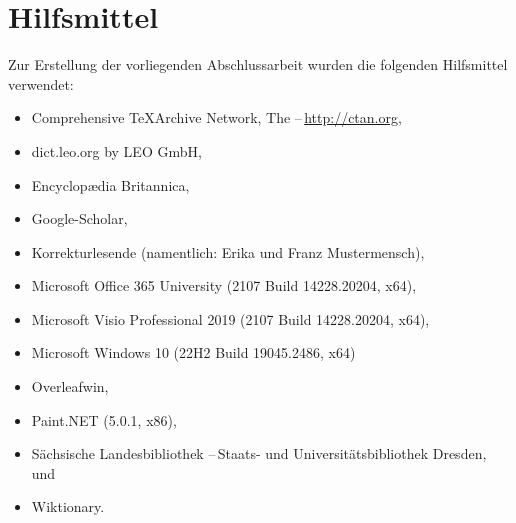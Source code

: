 \renewcommand{\bibname}{Quellenverzeichnis}


\label{Bibliography}
{}

\clearpage\section*{Hilfsmittel}
Zur Erstellung der vorliegenden Abschlussarbeit wurden die folgenden Hilfsmittel verwendet:
\begin{itemize}
	\item Comprehensive \TeX Archive Network, The --\,\url{http://ctan.org},
	\item dict.leo.org by LEO GmbH,
	\item Encyclop{\ae}dia Britannica,
	\item Google-Scholar,
	\item Korrekturlesende (namentlich: Erika und Franz Mustermensch),
	\item Microsoft Office 365 University (2107 Build 14228.20204, x64),
	\item Microsoft Visio Professional 2019 (2107 Build 14228.20204, x64),
	\item Microsoft Windows 10 (22H2 Build 19045.2486, x64)
	\item Overleafwin,
	\item Paint.NET (5.0.1, x86),
	\item S{\"a}chsische Landesbibliothek \mbox{--\,Staats}- und Universit{\"a}tsbibliothek Dresden, und
	\item Wiktionary.
\end{itemize}

